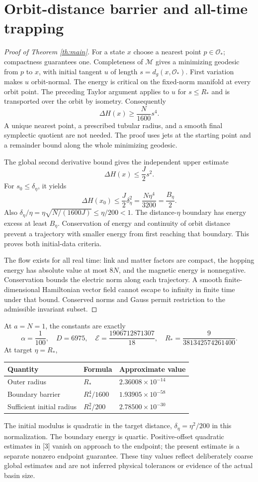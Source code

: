 \documentclass[11pt,a4paper]{article}
\begin{document}
\section{Orbit-distance barrier and all-time trapping}
\begin{proof}[Proof of Theorem \ref{th:main}]
For a state $x$ choose a nearest point $p\in\mathcal O_*$; compactness guarantees one. Completeness of $\mathcal M$ gives a minimizing geodesic from $p$ to $x$, with initial tangent $u$ of length $s=d_g(x,\mathcal O_*)$. First variation makes $u$ orbit-normal. The energy is critical on the fixed-norm manifold at every orbit point. The preceding Taylor argument applies to $u$ for $s\le R_*$ and is transported over the orbit by isometry. Consequently
\[
\Delta H(x)\ge\frac N{1600}s^4.
\]
A unique nearest point, a prescribed tubular radius, and a smooth final symplectic quotient are not needed. The proof uses jets at the starting point and a remainder bound along the whole minimizing geodesic.

The global second derivative bound gives the independent upper estimate
\[
\Delta H(x)\le\frac J2s^2.
\]
For $s_0\le\delta_\eta$, it yields
\[
\Delta H(x_0)\le\frac J2\delta_\eta^2
=\frac{N\eta^4}{3200}=\frac{B_\eta}{2}.
\]
Also $\delta_\eta/\eta=\eta\sqrt{N/(1600J)}\le\eta/200<1$. The distance-$\eta$ boundary has energy excess at least $B_\eta$. Conservation of energy and continuity of orbit distance prevent a trajectory with smaller energy from first reaching that boundary. This proves both initial-data criteria.

The flow exists for all real time: link and matter factors are compact, the hopping energy has absolute value at most $8N$, and the magnetic energy is nonnegative. Conservation bounds the electric norm along each trajectory. A smooth finite-dimensional Hamiltonian vector field cannot escape to infinity in finite time under that bound. Conserved norms and Gauss permit restriction to the admissible invariant subset.
\end{proof}

At $a=N=1$, the constants are exactly
\[
\alpha=\frac1{100},\quad D=6975,\quad
\mathcal E=\frac{1906712871307}{18},\quad
R_* =\frac9{381342574261400}.
\]
At target $\eta=R_*$,
\begin{center}
\begin{tabular}{lll}\toprule
Quantity & Formula & Approximate value\\\midrule
Outer radius & $R_*$ & $2.36008\times10^{-14}$\\
Boundary barrier & $R_*^4/1600$ & $1.93905\times10^{-58}$\\
Sufficient initial radius & $R_*^2/200$ & $2.78500\times10^{-30}$\\\bottomrule
\end{tabular}
\end{center}
The initial modulus is quadratic in the target distance, $\delta_\eta=\eta^2/200$ in this normalization. The boundary energy is quartic. Positive-offset quadratic estimates in [3] vanish on approach to the endpoint; the present estimate is a separate nonzero endpoint guarantee. These tiny values reflect deliberately coarse global estimates and are not inferred physical tolerances or evidence of the actual basin size.
\newpage
\end{document}
